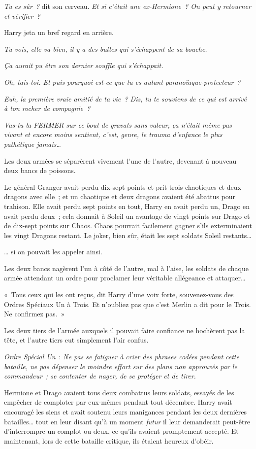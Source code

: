 \emph{Tu es sûr~?} dit son cerveau. \emph{Et si c'était une ex-Hermione~? On peut y retourner et vérifier~?}

Harry jeta un bref regard en arrière.

\emph{Tu vois, elle va bien, il y a des bulles qui s'échappent de sa bouche.}

\emph{Ça aurait pu être son dernier souffle qui s'échappait.}

\emph{Oh, tais-toi. Et puis pourquoi est-ce que tu es autant paranoïaque-protecteur~?}

\emph{Euh, la première vraie amitié de ta vie~? Dis, tu te souviens de ce qui est arrivé à ton rocher de compagnie~?}

\emph{Vas-tu la FERMER sur ce bout de gravats sans valeur, ça n'était même pas vivant et encore moins sentient, c'est, genre, le trauma d'enfance le plus pathétique jamais…}

Les deux armées se séparèrent vivement l'une de l'autre, devenant à nouveau deux bancs de poissons.

Le général Granger avait perdu dix-sept points et prit trois chaotiques et deux dragons avec elle~; et un chaotique et deux dragons avaient été abattus pour trahison. Elle avait perdu sept points en tout, Harry en avait perdu un, Drago en avait perdu deux~; cela donnait à Soleil un avantage de vingt points sur Drago et de dix-sept points sur Chaos. Chaos pourrait facilement gagner s'ils exterminaient les vingt Dragons restant. Le joker, bien sûr, était les sept soldats Soleil restants…

… si on pouvait les appeler ainsi.

Les deux bancs nagèrent l'un à côté de l'autre, mal à l'aise, les soldats de chaque armée attendant un ordre pour proclamer leur véritable allégeance et attaquer…

«~Tous ceux qui les ont reçus, dit Harry d'une voix forte, souvenez-vous des Ordres Spéciaux Un à Trois. Et n'oubliez pas que c'est Merlin a dit pour le Trois. Ne confirmez pas.~»

Les deux tiers de l'armée auxquels il pouvait faire confiance ne hochèrent pas la tête, et l'autre tiers eut simplement l'air confus.

\emph{Ordre Spécial Un}~: \emph{Ne pas se fatiguer à crier des phrases codées pendant cette bataille, ne pas dépenser le moindre effort sur des plans non approuvés par le commandeur~; se contenter de nager, de se protéger et de tirer.}

Hermione et Drago avaient tous deux combattus leurs soldats, essayés de les empêcher de comploter par eux-mêmes pendant tout décembre. Harry avait encouragé les siens et avait soutenu leurs manigances pendant les deux dernières batailles… tout en leur disant qu'à un moment \emph{futur} il leur demanderait peut-être d'interrompre un complot ou deux, ce qu'ils avaient promptement accepté. Et maintenant, lors de cette bataille critique, ils étaient heureux d'obéir.

